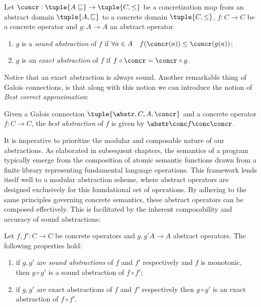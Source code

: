 \begin{definition}
  Let \(\concr : \tuple{A \sqsubseteq} \to \tuple{C, \leq}\) be a
  concretization map from an abstract domain
  \(\tuple{A, \sqsubseteq}\) to a concrete domain \(\tuple{C, \leq}\),
  \(f : C \to C\) be a concrete operator and \(g : A \to A\) an
  abstract operator.
  \begin{enumerate}
  \item \(g\) is a \emph{sound abstraction} of \(f\) if
    \(\forall a \in A \quad f(\concr(a)) \leq \concr(g(a))\);
  \item \(g\) is an \emph{exact abstraction} of \(f\) if
    \(f \circ \concr = \concr \circ g\).
  \end{enumerate}
\end{definition}

Notice that an exact abstraction is always sound.  Another remarkable
thing of Galois connections, is that along with this notion we can
introduce the notion of \emph{Best correct approximation}:

\begin{definition}\label{def:bca}
  Given a Galois connection \(\tuple{\abstr, C, A, \concr}\) and a
  concrete operator \(f : C \to C\), the \emph{best abstraction} of
  \(f\) is given by \(\abstr \conc f \conc \concr\).
\end{definition}

It is imperative to prioritize the modular and composable nature of
our abstractions. As elaborated in subsequent chapters, the semantics
of a program typically emerge from the composition of atomic semantic
functions drawn from a finite library representing fundamental
language operations. This framework lends itself well to a modular
abstraction scheme, where abstract operators are designed exclusively
for this foundational set of operations. By adhering to the same
principles governing concrete semantics, these abstract operators can
be composed effectively. This is facilitated by the inherent
composability and accuracy of sound abstractions:

\begin{theorem}\label{th:opcomp}
  Let \(f, f' : C \to C\) be concrete operators and \(g, g' A \to A\)
  abstract operators. The following properties hold:
  \begin{enumerate}[label=(\arabic*)]
  \item if \(g, g'\) are \emph{sound abstractions} of \(f\) and \(f'\)
    respectively and \(f\) is monotonic, then \(g \circ g'\) is a
    sound abstraction of \(f \circ f'\);
  \item if \(g, g'\) are exact abstractions of \(f\) and \(f'\)
    respectively then \(g \circ g'\) is an exact abstraction of
    \(f \circ f'\).
  \end{enumerate}
\end{theorem}

